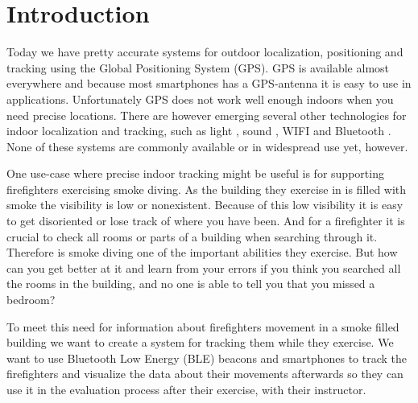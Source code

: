 \documentclass[../Main/thesis.tex]{subfiles}
\begin{document}
\chapter{Introduction}
\label{ch:introduction}


Today we have pretty accurate systems for outdoor localization, positioning and tracking using the Global Positioning System (GPS). 
GPS is available almost everywhere and because most smartphones has a GPS-antenna it is easy to use in applications.
Unfortunately GPS does not work well enough indoors when you need precise locations.
There are however emerging several other technologies for indoor localization and tracking, such as light \citep{xiaohan2010improved}, sound \citep{schweinzer2010ultrasonic}, WIFI  \citep{chang2010robust} and Bluetooth \citep{Takahashi2016}.
None of these systems are commonly available or in widespread use yet, however.

One use-case where precise indoor tracking might be useful is for supporting firefighters exercising smoke diving. 
As the building they exercise in is filled with smoke the visibility is low or nonexistent.
Because of this low visibility it is easy to get disoriented or lose track of where you have been.
And for a firefighter it is crucial to check all rooms or parts of a building when searching through it.
Therefore is smoke diving one of the important abilities they exercise.
But how can you get better at it and learn from your errors if you think you searched all the rooms in the building, and no one is able to tell you that you missed a bedroom?

To meet this need for information about firefighters movement in a smoke filled building we want to create a system for tracking them while they exercise.
We want to use Bluetooth Low Energy (BLE) beacons and smartphones to track the firefighters and visualize the data about their movements afterwards so they can use it in the evaluation process after their exercise, with their instructor.
\end{document}
